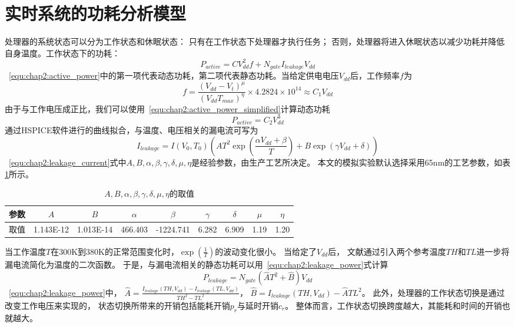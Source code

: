 \section{实时系统的功耗分析模型}
\label{sec:power}
处理器的系统状态可以分为工作状态和休眠状态： 只有在工作状态下处理器才执行任务； 否则，处理器将进入休眠状态以减少功耗并降低自身温度。工作状态下的功耗：
\begin{equation}
\label{equ:chap2:active_power}
P_{active} = CV_{dd}^2f+N_{gate}I_{leakage}V_{dd}
\end{equation}
~\ref{equ:chap2:active_power}中的第一项代表动态功耗，第二项代表静态功耗。当给定供电电压$V_{dd}$后，工作频率$f$为
\begin{equation}
\label{equ:chap2:freq}
f = \frac{(V_{dd}-V_t)^\mu}{(V_{dd}T_{max})^\eta}\times 4.2824\times 10^{14} \approx C_1V_{dd}
\end{equation}
由于与工作电压成正比，我们可以使用~\ref{equ:chap2:active_power_simplified}计算动态功耗
\begin{equation}
\label{equ:chap2:active_power_simplified}
P_{active} = C_2V_{dd}^3
\end{equation}
通过HSPICE软件进行的曲线拟合，与温度、电压相关的漏电流可写为
\begin{equation}
\label{equ:chap2:leakage_current}
I_{leakage} = I(V_0,T_0)(AT^2\exp(\frac{\alpha V_{dd}+\beta}{T})+B\exp(\gamma V_{dd}+\delta))
\end{equation}
~\ref{equ:chap2:leakage_current}式中$A,B,\alpha,\beta,\gamma,\delta,\mu,\eta$是经验参数，由生产工艺所决定。 本文的模拟实验默认选择采用65nm的工艺参数，如表\ref{tab:chap2:tech-parameters}所示。
\begin{table}
\caption{$A,B,\alpha,\beta,\gamma,\delta,\mu,\eta$的取值}
\centering
\begin{tabular}{c c c c c c c c c}
\hline\hline
参数 & $A$ & $B$ & $\alpha$ & $\beta$ & $\gamma$ & $\delta$ & $\mu$ & $\eta$ \\
\hline
取值 & 1.143E-12 & 1.013E-14 & 466.403 & -1224.741 & 6.282 & 6.909 & 1.19 & 1.20 \\
\hline
\end{tabular}
\label{tab:chap2:tech-parameters}
\end{table}

当工作温度$T$在300K到380K的正常范围变化时，$\exp(\frac{1}{T})$的波动变化很小。 当给定了$V_{dd}$后， 文献通过引入两个参考温度$TH$和$TL$进一步将漏电流简化为温度的二次函数。 于是，与漏电流相关的静态功耗可以用~\ref{equ:chap2:leakage_power}式计算
\begin{equation}
\label{equ:chap2:leakage_power}
P_{leakage} = N_{gate}(\hat{A}T^2+\hat{B})V_{dd}
\end{equation}
~\ref{equ:chap2:leakage_power}中，
$\hat{A}=\frac{I_{leakage}(TH,V_{dd})-I_{leakage}(TL,V_{dd})}{{TH}^2-{TL}^2}$，
$\hat{B}=I_{leakage}(TH,V_{dd})-\hat{A}{TL}^2$。
此外，处理器的工作状态切换是通过改变工作电压来实现的， 状态切换所带来的开销包括能耗开销$p_r$与延时开销$c_r$。 整体而言，工作状态切换跨度越大，其能耗和时间的开销也就越大。

